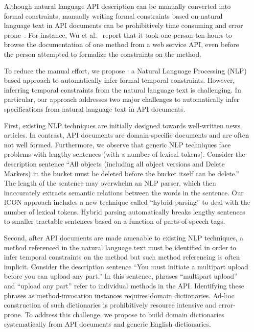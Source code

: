 Although natural language API description can be manually converted into formal constraints,
manually writing formal constraints based on natural language text in API documents can be prohibitively time consuming and error prone~\cite{wu2013inferring,RubingerWEB10}. 
For instance, Wu et al.~\cite{wu2013inferring} report that it took one person ten hours to browse the documentation of one method from a web service API, even before the person attempted to formalize the constraints on the method.


To reduce the manual effort, we propose \tool: a Natural Language Processing (NLP) based approach
to automatically infer formal temporal constraints. 
However, inferring temporal constraints from the natural language text is challenging. 
In particular, our approach addresses two major challenges to automatically infer specifications
from natural language text in API documents.

First, existing NLP techniques are initially designed towards well-written news articles.
In contrast, API documents are domain-specific documents and are often not well formed.
Furthermore, we observe that generic NLP techniques face problems with lengthy sentences (with a number of lexical tokens).
Consider the description sentence ``All objects (including all object versions and Delete Markers) in the bucket must be deleted before the bucket itself can be delete.'' The length of the sentence may overwhelm an NLP parser, which then inaccurately extracts semantic relations between the words in the sentence.
Our ICON approach includes a new technique called ``hybrid parsing'' to deal with the number of lexical tokens.
Hybrid parsing automatically breaks lengthy sentences to smaller tractable sentences based on a function of parts-of-speech tags.   

Second, after API documents are made amenable to existing NLP techniques, a method referenced in the natural language text must be identified in order to infer temporal constraints on the method but such method referencing is often implicit.
Consider the description sentence ``You must initiate a multipart upload before you can upload any part.''
In this sentence, phrases ``multipart upload'' and ``upload any part'' refer to individual methods in the API.
Identifying these phrases as method-invocation instances requires domain dictionaries.
Ad-hoc construction of such dictionaries is prohibitively resource intensive and error-prone.
To address this challenge, we propose to build domain dictionaries systematically from API documents and generic English dictionaries.  

